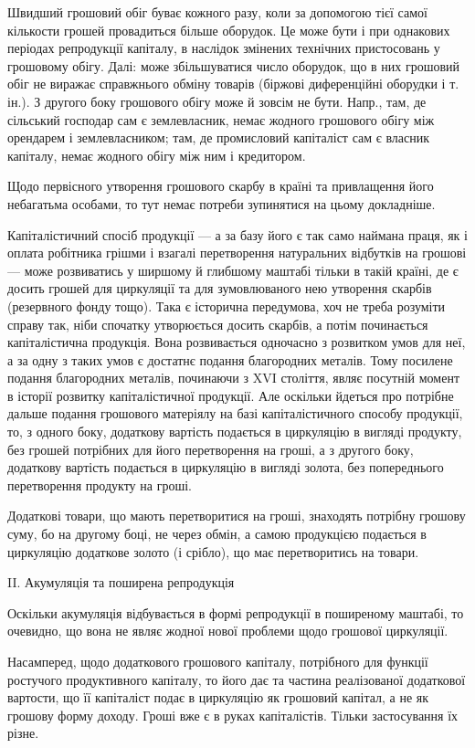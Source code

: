 Швидший грошовий обіг буває кожного разу, коли за допомогою тієї
самої кількости грошей провадиться більше оборудок. Це може бути і
при однакових періодах репродукції капіталу, в наслідок змінених технічних
пристосовань у грошовому обігу. Далі: може збільшуватися число
оборудок, що в них грошовий обіг не виражає справжнього обміну товарів
(біржові диференційні оборудки і т. ін.). З другого боку грошового
обігу може й зовсім не бути. Напр., там, де сільський господар сам є
землевласник, немає жодного грошового обігу між орендарем і землевласником;
там, де промисловий капіталіст сам є власник капіталу, немає
жодного обігу між ним і кредитором.

Щодо первісного утворення грошового скарбу в країні та привлащення
його небагатьма особами, то тут немає потреби зупинятися на
цьому докладніше.

Капіталістичний спосіб продукції — а за базу його є так само наймана
праця, як і оплата робітника грішми і взагалі перетворення натуральних
відбутків на грошові — може розвиватись у ширшому й глибшому маштабі
тільки в такій країні, де є досить грошей для циркуляції та для
зумовлюваного нею утворення скарбів (резервного фонду тощо). Така є
історична передумова, хоч не треба розуміти справу так, ніби спочатку
утворюється досить скарбів, а потім починається капіталістична продукція.
Вона розвивається одночасно з розвитком умов для неї, а за одну з
таких умов є достатнє подання благородних металів. Тому посилене подання
благородних металів, починаючи з XVI століття, являє посутній
момент в історії розвитку капіталістичної продукції. Але оскільки йдеться
про потрібне дальше подання грошового матеріялу на базі капіталістичного
способу продукції, то, з одного боку, додаткову вартість
подається в циркуляцію в вигляді продукту, без грошей потрібних для
його перетворення на гроші, а з другого боку, додаткову вартість подається
в циркуляцію в вигляді золота, без попереднього перетворення
продукту на гроші.

Додаткові товари, що мають перетворитися на гроші, знаходять потрібну
грошову суму, бо на другому боці, не через обмін, а самою продукцією
подається в циркуляцію додаткове золото (і срібло), що має
перетворитись на товари.

II. Акумуляція та поширена репродукція

Оскільки акумуляція відбувається в формі репродукції в поширеному
маштабі, то очевидно, що вона не являє жодної нової проблеми щодо грошової
циркуляції.

Насамперед, щодо додаткового грошового капіталу, потрібного для
функції ростучого продуктивного капіталу, то його дає та частина реалізованої
додаткової вартости, що її капіталіст подає в циркуляцію як грошовий
капітал, а не як грошову форму доходу. Гроші вже є в руках
капіталістів. Тільки застосування їх різне.
